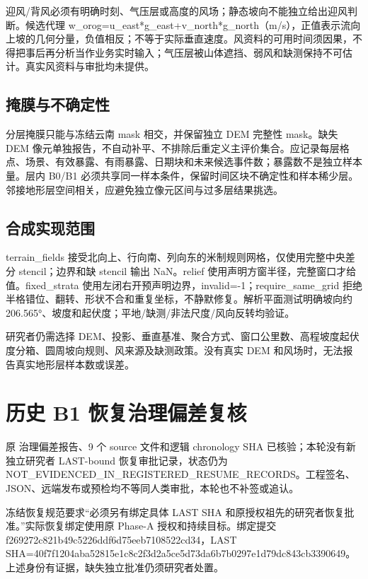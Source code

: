\documentclass[UTF8,a4paper,10pt,fontset=fandol]{ctexart}
\begin{document}
迎风/背风必须有明确时刻、气压层或高度的风场；静态坡向不能独立给出迎风判断。候选代理 w\_orog=u\_east*g\_east+v\_north*g\_north（m/s），正值表示流向上坡的几何分量，负值相反；不等于实际垂直速度。风资料的可用时间须因果，不得把事后再分析当作业务实时输入；气压层被山体遮挡、弱风和缺测保持不可估计。真实风资料与审批均未提供。\par

\subsection*{掩膜与不确定性}

分层掩膜只能与冻结云南 mask 相交，并保留独立 DEM 完整性 mask。缺失 DEM 像元单独报告，不自动补平、不排除后重定义主评价集合。应记录每层格点、场景、有效暴露、有雨暴露、日期块和未来候选事件数；暴露数不是独立样本量。层内 B0/B1 必须共享同一样本条件，保留时间区块不确定性和样本稀少层。邻接地形层空间相关，应避免独立像元区间与过多层结果挑选。\par

\subsection*{合成实现范围}

terrain\_fields 接受北向上、行向南、列向东的米制规则网格，仅使用完整中央差分 stencil；边界和缺 stencil 输出 NaN。relief 使用声明方窗半径，完整窗口才给值。fixed\_strata 使用左闭右开预声明边界，invalid=-1；require\_same\_grid 拒绝半格错位、翻转、形状不合和重复坐标，不静默修复。解析平面测试明确坡向约 206.565°、坡度和起伏度；平地/缺测/非法尺度/风向反转均验证。\par

研究者仍需选择 DEM、投影、垂直基准、聚合方式、窗口公里数、高程坡度起伏度分箱、圆周坡向规则、风来源及缺测政策。没有真实 DEM 和风场时，无法报告真实地形层样本数或误差。\par

\clearpage
\section*{历史 B1 恢复治理偏差复核}

原 治理偏差报告、9 个 source 文件和逻辑 chronology SHA 已核验；本轮没有新独立研究者 LAST-bound 恢复审批记录，状态仍为 NOT\_EVIDENCED\_IN\_REGISTERED\_RESUME\_RECORDS。工程签名、JSON、远端发布或预检均不等同人类审批，本轮也不补签或追认。\par

冻结恢复规范要求“必须另有绑定具体 LAST SHA 和原授权祖先的研究者恢复批准。”实际恢复绑定使用原 Phase-A 授权和持续目标。绑定提交 f269272c821b49c5226ddf6d75eeb7108522cd34，LAST SHA=40f7f1204aba52815e1c8c2f3d2a5ce5d73da6b7b0297e1d79dc843cb3390649。上述身份有证据，缺失独立批准仍须研究者处置。\par
\end{document}

